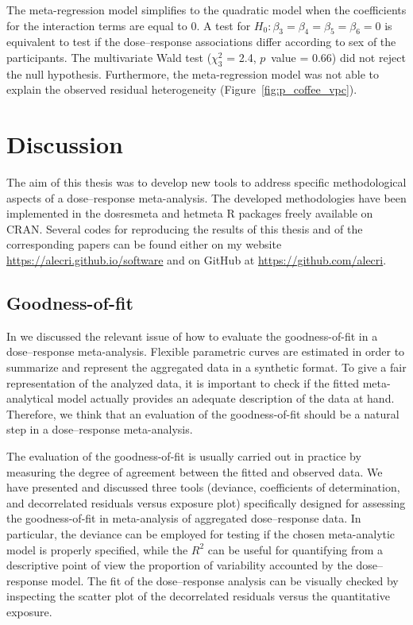 \documentclass[11pt,a4paper,twoside,openany]{book}\usepackage{knitr}
\newcommand{\pkg}[1]{{\fontseries{b}\selectfont #1}}
\begin{document}
{\noindent The meta-regression model simplifies to the quadratic model when the coefficients for the interaction terms are equal to 0. A test for $H_0: \beta_3 = \beta_4 = \beta_5 = \beta_6 = 0$ is equivalent to test if the dose--response associations differ according to sex of the participants.  The multivariate Wald test ($\chi_3^2$ = 2.4, $p$~value = 0.66) did not reject the null hypothesis. Furthermore, the meta-regression model was not able to explain the observed residual heterogeneity (Figure~\ref{fig:p_coffee_vpc}).


%

\chapter{Discussion}

The aim of this thesis was to develop new tools to address specific methodological aspects of a dose--response meta-analysis. The developed methodologies have been implemented in the \pkg{dosresmeta} and \pkg{hetmeta} \textsf{R} packages freely available on CRAN. Several codes for reproducing the results of this thesis and of the corresponding papers can be found either on my website \url{ https://alecri.github.io/software} and on GitHub at \url{ https://github.com/alecri}.


\section{Goodness-of-fit}

In  we discussed the relevant issue of how to evaluate the goodness-of-fit in a dose--response meta-analysis. Flexible parametric curves are estimated in order to summarize and represent the aggregated data in a synthetic format. To give a fair representation of the analyzed data, it is important to check if the fitted meta-analytical model actually provides an adequate description of the data at hand. Therefore, we think that an evaluation of the goodness-of-fit should be a natural step in a dose--response meta-analysis.

The evaluation of the goodness-of-fit is usually carried out in practice by measuring the degree of agreement between the fitted and observed data. We have presented and discussed three tools (deviance, coefficients of determination, and decorrelated residuals versus exposure plot) specifically designed for assessing the goodness-of-fit in meta-analysis of aggregated dose--response data. In particular, the deviance can be employed for testing if the chosen meta-analytic model is properly specified, while the $R^2$ can be useful for quantifying from a descriptive point of view the proportion of variability accounted by the dose--response model. The fit of the dose--response analysis can be visually checked by inspecting the scatter plot of the decorrelated residuals versus the quantitative exposure.

}
\end{document}
